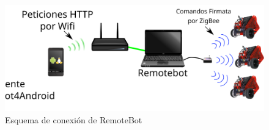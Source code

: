 
\begin{figure}
    \centering
    \includegraphics[width=\textwidth]{figures/arquitectura_remotebot}
    \caption{Esquema de conexión de RemoteBot}\label{fig:arquitectura_remotebot}
\end{figure}


